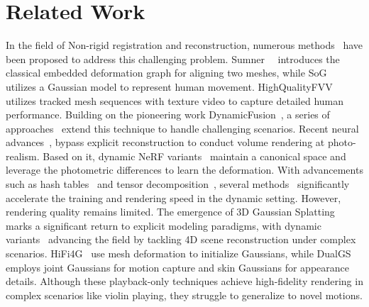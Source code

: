 

 
\section{Related Work} 



In the field of Non-rigid registration and reconstruction, numerous methods~\cite{suo2021neuralhumanfvv, sun2021HOI-FVV, UnstructureLan, fridovich2023k, cao2023hexplane, wang2023videorf} have been proposed to address this challenging problem. Sumner~\etal~\cite{sumner2007embedded} introduces the classical embedded deformation graph for aligning two meshes, while SoG~\cite{StollHGST2011} utilizes a Gaussian model to represent human movement. HighQualityFVV~\cite{collet2015high} utilizes tracked mesh sequences with texture video to capture detailed human performance. Building on the pioneering work DynamicFusion~\cite{newcombe2015dynamicfusion}, a series of approaches~\cite{dou2016fusion4d, motion2fusion, KillingFusion2017cvpr, slavcheva2018sobolevfusion, robustfusion, su2022robustfusionPlus, jiang2022neuralhofusion} extend this technique to handle challenging scenarios. 
Recent neural advances~\cite{nerf}, bypass explicit reconstruction to conduct volume rendering at photo-realism. Based on it, dynamic NeRF variants~\cite{tretschk2021nonrigid, park2021nerfies, weng_humannerf_2022_cvpr} maintain a canonical space and leverage the photometric differences to learn the deformation. With advancements such as hash tables~\cite{muller2022instant} and tensor decomposition~\cite{chen2022tensorf}, several methods~\cite{isik2023humanrf, zhao2022human, jiang2023instant, song2023nerfplayer} significantly accelerate the training and rendering speed in the dynamic setting. However, rendering quality remains limited. The emergence of 3D Gaussian Splatting~\cite{kerbl20233d} marks a significant return to explicit modeling paradigms, with dynamic variants~\cite{luiten2023dynamic, li2023spacetime, duan20244d, guo2024motion, huang2024sc, labe2024dgd, gao2024gaussianflow, lin2024gaussian} advancing the field by tackling 4D scene reconstruction under complex scenarios. HiFi4G~\cite{jiang2024hifi4g} use mesh deformation to initialize Gaussians, while DualGS~\cite{jiang2024robust} employs joint Gaussians for motion capture and skin Gaussians for appearance details. Although these playback-only techniques achieve high-fidelity rendering in complex scenarios like violin playing, they struggle to generalize to novel motions.

